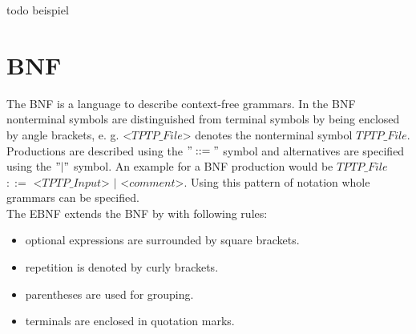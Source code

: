 todo beispiel
\section{\acf{BNF}}\label{sec:BackgroundBNF}
The  \acf{BNF} is a language to describe context-free grammars.
In the \acf{BNF} nonterminal symbols are distinguished from terminal symbols by being enclosed by  angle brackets, e. g. <$TPTP\_File$> denotes the nonterminal symbol $TPTP\_File$.
Productions are described using the $"::="$ symbol and alternatives are specified using the $"|"$ symbol. \cite{BNF.1964} 
An example for a \ac{BNF} production would be $TPTP\_File$ $::=$ <$TPTP\_Input$> $|$ <$comment$>.
Using this pattern of notation whole grammars can be specified.\\
The \ac{EBNF} extends the \ac{BNF} by with following rules:

\begin{itemize}%
	\item optional expressions are surrounded by square brackets.
	\item repetition is denoted by curly brackets.
	\item parentheses are used for grouping.
	\item terminals are enclosed in quotation marks.
\end{itemize}
\label{itemize:BackgroundBNF}
\cite{EBNF.1977}

